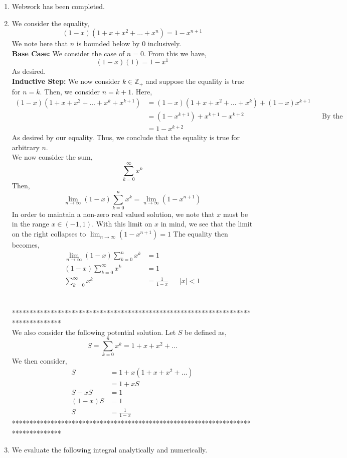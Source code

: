 \documentclass[letterpaper,10pt]{article}
\newcommand{\Z}{\mathbb{Z}}
\begin{document}
\begin{enumerate}
\item Webwork has been completed.
\item We consider the equality,
\[(1-x)(1+x+x^2+\ldots+x^n)=1-x^{n+1}\]
We note here that $n$ is bounded below by $0$ inclusively. \\
\textbf{Base Case:} We consider the case of $n=0$. From this we have,
\[(1-x)(1)=1-x^1\]
As desired.\\
\textbf{Inductive Step:} We now consider $k\in \Z_+$ and suppose the equality is true for $n=k$. Then, we consider $n=k+1$. Here,
\begin{align*}
(1-x)(1+x+x^2+\ldots+x^k+x^{k+1}) &= (1-x)(1+x+x^2+\ldots+x^k)+(1-x)x^{k+1}\\
&=(1-x^{k+1})+x^{k+1}-x^{k+2} && \text{By the induction hypothesis}\\
&=1-x^{k+2}
\end{align*}
As desired by our equality. Thus, we conclude that the equality is true for arbitrary $n$.\\
We now consider the sum,
\[\sum_{k=0}^{\infty}x^k\]
Then,
\[\lim_{n\to \infty}(1-x)\sum_{k=0}^{n}x^k=\lim_{n\to \infty}(1-x^{n+1})\]
In order to maintain a non-zero real valued solution, we note that $x$ must be in the range $x\in(-1,1)$. With this limit on $x$ in mind, we see that the limit on the right collapses to $\lim_{n\to \infty} (1-x^{n+1})=1$ The equality then becomes,
\begin{align*}
\lim_{n\to \infty}(1-x)\sum_{k=0}^{n}x^k &= 1\\
(1-x)\sum_{k=0}^{\infty}x^k &= 1\\
\sum_{k=0}^{\infty}x^k &= \frac{1}{1-x} && |x|<1
\end{align*}\\\\
**********************************************************************************\\
We also consider the following potential solution. Let $S$ be defined as,
\[S=\sum_{k=0}^{n}x^k=1+x+x^2+\ldots\]
We then consider,
\begin{align*}
S &= 1+x(1+x+x^2+\ldots)\\
&= 1+xS\\
S-xS &= 1\\
(1-x)S &= 1\\
S &= \frac{1}{1-x}
\end{align*}
**********************************************************************************
\item We evaluate the following integral analytically and numerically.

\end{enumerate}
\end{document}

